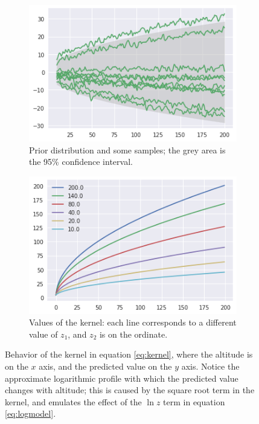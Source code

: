 \documentclass[12pt]{book}
\begin{document}
\begin{figure}
    \centering
    \begin{subfigure}[t]{0.45\textwidth}
        \centering
        \includegraphics[width=\textwidth]{images/profile_kernel_prior}
        \caption{Prior distribution and some samples; the grey area is the 95\% confidence interval.}
        \label{fig:kernel_prior}
    \end{subfigure}
    \hfill
    \begin{subfigure}[t]{0.45\textwidth}
        \centering
        \includegraphics[width=\textwidth]{images/kernel_values}
        \caption{Values of the kernel: each line corresponds to a different value of $z_1$, and $z_2$ is on the ordinate.}
        \label{fig:kernel_values}
    \end{subfigure}
    \caption{Behavior of the kernel in equation \ref{eq:kernel}, where the altitude is on the $x$ axis, and the predicted value on the $y$ axis. Notice the approximate logarithmic profile with which the predicted value changes with altitude; this is caused by the square root term in the kernel, and emulates the effect of the $\ln z$ term in equation \ref{eq:logmodel}.}
	\label{fig:kernel}
\end{figure}
\end{document}
